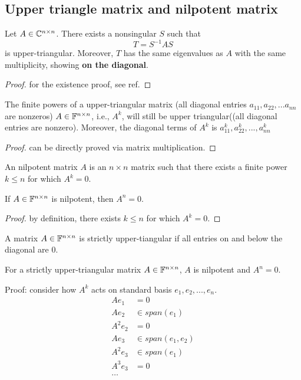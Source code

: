 \begin{refsection}
\subsection{Upper triangle matrix and nilpotent matrix}
\begin{theorem}
	\cite[149]{axler2015linear}
	Let $A\in \mathbb{C}^{n\times n}$. There exists a nonsingular $S$ such that $$T = S^{-1}AS$$ is upper-triangular. Moreover, $T$ has the same eigenvalues as $A$ with the same multiplicity, showing \textbf{on the diagonal}. 
\end{theorem}
\begin{proof}
	for the existence proof, see ref.
\end{proof}

\begin{lemma}
	The finite powers of a upper-triangular matrix (all diagonal entries $a_{11},a_{22},...a_{nn}$ are nonzeros) $A\in \mathbb{F}^{n\times n}$, i.e., $A^k$, will still be upper triangular((all diagonal entries are nonzero). Moreover, the diagonal terms of $A^k$ is $a_{11}^k,a_{22}^k,...,a_{nn}^k$ 
\end{lemma}
\begin{proof}
	can be directly proved via matrix multiplication.
\end{proof}


\begin{definition}
	An nilpotent matrix $A$ is an $n\times n$ matrix such that there exists a finite power $k \leq n$ for which $A^k = 0$.
\end{definition}

\begin{lemma}
	If $A\in \mathbb{F}^{n\times n}$ is nilpotent, then $A^n = 0$. 
\end{lemma}
\begin{proof}
	by definition,  there exists $k \leq n$ for which $A^k = 0$.
\end{proof}


\begin{definition}
	A matrix $A\in \mathbb{F}^{n\times n}$ is strictly upper-tiangular if all entries on and below the diagonal are 0.
\end{definition}


\begin{lemma}
	For a strictly upper-triangular matrix $A\in \mathbb{F}^{n\times n}$, $A$ is nilpotent and $A^n = 0$.
\end{lemma}
Proof: consider how $A^k$ acts on standard basis $e_1,e_2,...,e_n$. 
\begin{align*}
Ae_1 &= 0\\
Ae_2 &\in span(e_1)\\
A^2 e_2 &= 0\\
Ae_3 &\in span(e_1,e_2)\\
A^2e_3 &\in span(e_1)\\
A^3e_3 & =0\\
\dots
\end{align*}



\end{refsection}
